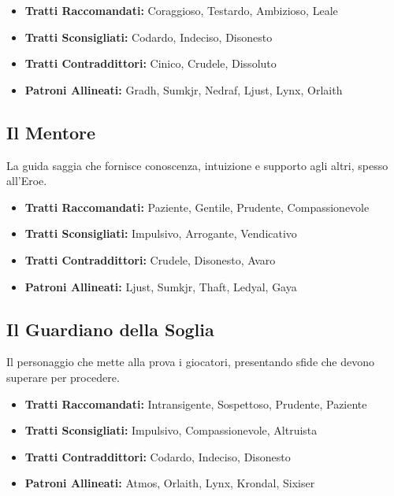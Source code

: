 \begin{multicols}{2}
\noindent\begin{itemize}[leftmargin=*] \setlength{\itemsep}{0pt}
\item \textbf{Tratti Raccomandati:} Coraggioso, Testardo, Ambizioso, Leale
\item \textbf{Tratti Sconsigliati:} Codardo, Indeciso, Disonesto
\item \textbf{Tratti Contraddittori:} Cinico, Crudele, Dissoluto
\item \textbf{Patroni Allineati:} Gradh, Sumkjr, Nedraf, Ljust, Lynx, Orlaith
\end{itemize}

\subsection*{Il Mentore}
La guida saggia che fornisce conoscenza, intuizione e supporto agli altri, spesso all'Eroe.

\noindent\begin{itemize}[leftmargin=*] \setlength{\itemsep}{0pt}
\item \textbf{Tratti Raccomandati:} Paziente, Gentile, Prudente, Compassionevole
\item \textbf{Tratti Sconsigliati:} Impulsivo, Arrogante, Vendicativo
\item \textbf{Tratti Contraddittori:} Crudele, Disonesto, Avaro
\item \textbf{Patroni Allineati:} Ljust, Sumkjr, Thaft, Ledyal, Gaya
\end{itemize}

\subsection*{Il Guardiano della Soglia}
Il personaggio che mette alla prova i giocatori, presentando sfide che devono superare per procedere.

\noindent\begin{itemize}[leftmargin=*] \setlength{\itemsep}{0pt}
\item \textbf{Tratti Raccomandati:} Intransigente, Sospettoso, Prudente, Paziente
\item \textbf{Tratti Sconsigliati:} Impulsivo, Compassionevole, Altruista
\item \textbf{Tratti Contraddittori:} Codardo, Indeciso, Disonesto
\item \textbf{Patroni Allineati:} Atmos, Orlaith, Lynx, Krondal, Sixiser
\end{itemize}


\end{multicols}
